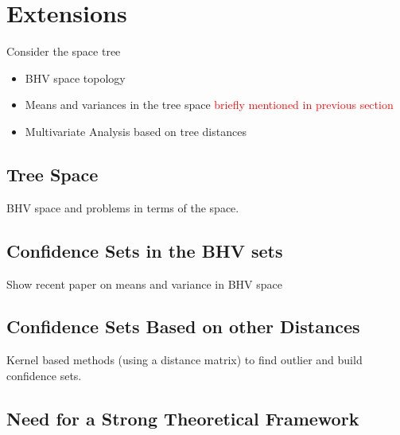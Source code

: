 \section{Extensions} \label{sec:extensions}

Consider the space tree
\begin{itemize}
 \item BHV space topology
 \item Means and variances in the tree space \textcolor{red}{briefly mentioned in previous section}
 \item Multivariate Analysis based on tree distances
\end{itemize}

\subsection{Tree Space} \label{sec:Tree-distances}

BHV space and problems in terms of the space. 

\subsection{Confidence Sets in the BHV sets} \label{sec:means-and-variance}

Show recent paper on means and variance in BHV space

\subsection{Confidence Sets Based on other Distances} \label{sec:kernel}

Kernel based methods (using a distance matrix) to find outlier and build confidence sets. 

\subsection{Need for a Strong Theoretical Framework}